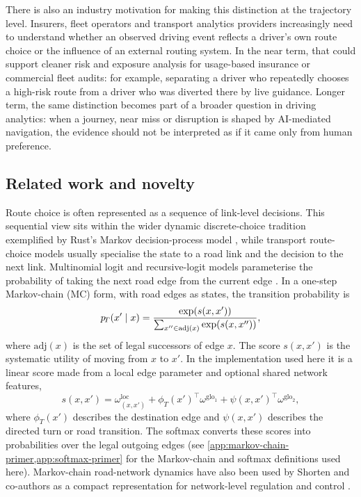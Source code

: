 There is also an industry motivation for making this distinction at the
trajectory level. Insurers, fleet operators and transport analytics
providers increasingly need to understand whether an observed driving
event reflects a driver's own route choice or the influence of an external
routing system. In the near term, that could support cleaner risk and
exposure analysis for usage-based insurance or commercial fleet audits:
for example, separating a driver who repeatedly chooses a high-risk route
from a driver who was diverted there by live guidance. Longer term, the
same distinction becomes part of a broader question in driving analytics:
when a journey, near miss or disruption is shaped by AI-mediated
navigation, the evidence should not be interpreted as if it came only from
human preference.

\subsection{Related work and novelty}
\label{sec:inverse-mc}\label{sec:route-softmax}\label{sec:partial-route-prior}\label{sec:rerouting-prior}

Route choice is often represented as a sequence of link-level decisions.
This sequential view sits within the wider dynamic discrete-choice
tradition exemplified by Rust's Markov decision-process model
\cite{rust1987}, while transport route-choice models usually specialise
the state to a road link and the decision to the next link. Multinomial
logit and recursive-logit models parameterise the probability of taking
the next road edge from the current edge
\cite{ben-akiva1985,frejinger2007,fosgerau2013route,mai2015nested}. In a
one-step Markov-chain (MC) form, with road edges as states, the transition
probability is
\begin{equation}
p_{\!T}(x'\mid x) =
\frac{\exp(s(x,x'))}{\sum_{x'' \in \mathrm{adj}(x)} \exp(s(x,x''))},
\label{eq:softmax}
\end{equation}
where $\mathrm{adj}(x)$ is the set of legal successors of edge $x$.
The score $s(x,x')$ is the systematic utility of moving from $x$ to
$x'$. In the implementation used here it is a linear score made from a
local edge parameter and optional shared network features,
\[
s(x,x') =
\omega^{\mathrm{loc}}_{(x,x')}
+ \phi_T(x')^\top\omega^{\mathrm{glo}_1}
+ \psi(x,x')^\top\omega^{\mathrm{glo}_2},
\]
where $\phi_T(x')$ describes the destination edge and $\psi(x,x')$
describes the directed turn or road transition. The softmax converts
these scores into probabilities over the legal outgoing edges (see
\cref{app:markov-chain-primer,app:softmax-primer} for the Markov-chain
and softmax definitions used here). Markov-chain road-network dynamics
have also been used by Shorten and co-authors as a compact representation
for network-level regulation and control \cite{crisostomi2011google}.


